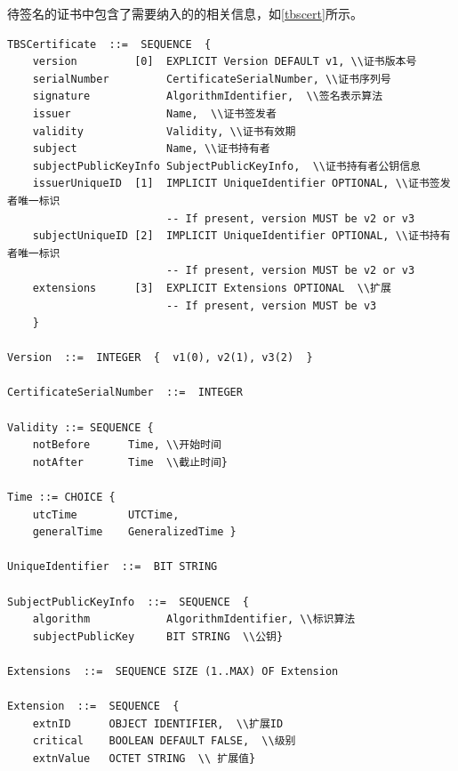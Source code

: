 待签名的证书中包含了需要纳入的的相关信息，如\ref{tbscert}所示。
 \begin{lstlisting}[caption={X.509证书包含字段},label=tbscert]
TBSCertificate  ::=  SEQUENCE  {
    version         [0]  EXPLICIT Version DEFAULT v1, \\证书版本号
    serialNumber         CertificateSerialNumber, \\证书序列号
    signature            AlgorithmIdentifier,  \\签名表示算法
    issuer               Name,  \\证书签发者
    validity             Validity, \\证书有效期
    subject              Name, \\证书持有者
    subjectPublicKeyInfo SubjectPublicKeyInfo,  \\证书持有者公钥信息
    issuerUniqueID  [1]  IMPLICIT UniqueIdentifier OPTIONAL, \\证书签发者唯一标识
                         -- If present, version MUST be v2 or v3 
    subjectUniqueID [2]  IMPLICIT UniqueIdentifier OPTIONAL, \\证书持有者唯一标识
                         -- If present, version MUST be v2 or v3
    extensions      [3]  EXPLICIT Extensions OPTIONAL  \\扩展
                         -- If present, version MUST be v3
    }

Version  ::=  INTEGER  {  v1(0), v2(1), v3(2)  }

CertificateSerialNumber  ::=  INTEGER

Validity ::= SEQUENCE {
    notBefore      Time, \\开始时间
    notAfter       Time  \\截止时间}

Time ::= CHOICE {
    utcTime        UTCTime,
    generalTime    GeneralizedTime }

UniqueIdentifier  ::=  BIT STRING

SubjectPublicKeyInfo  ::=  SEQUENCE  {
    algorithm            AlgorithmIdentifier, \\标识算法
    subjectPublicKey     BIT STRING  \\公钥}

Extensions  ::=  SEQUENCE SIZE (1..MAX) OF Extension 

Extension  ::=  SEQUENCE  {
    extnID      OBJECT IDENTIFIER,  \\扩展ID
    critical    BOOLEAN DEFAULT FALSE,  \\级别
    extnValue   OCTET STRING  \\ 扩展值}

\end{lstlisting}



